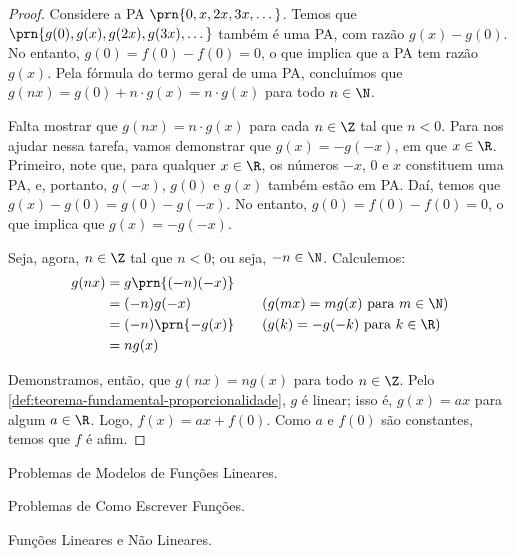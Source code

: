 \begin{proof}
    Considere a PA $\prn{0, x, 2x, 3x, \dots}$. Temos que $\prn{g(0), g(x), g(2x), g(3x), \dots}$
    também é uma PA, com razão $g(x)-g(0)$. No entanto, $g(0) = f(0)-f(0) = 0$, o que implica que a PA tem
    razão $g(x)$. Pela fórmula do termo geral de uma PA, concluímos que $g(nx) = g(0) + n\cdot g(x) = n\cdot g(x)$
    para todo $n \in \N$.

    Falta mostrar que $g(nx) = n \cdot g(x)$ para cada $n \in \Z$ tal que $n < 0$.
    Para nos ajudar nessa tarefa, vamos demonstrar que $g(x) = -g(-x)$, em que $x \in \R$. 
    Primeiro, note que, para qualquer $x \in \R$, os números $-x$, $0$ e $x$
    constituem uma PA, e, portanto, $g(-x)$, $g(0)$ e $g(x)$ também estão em PA. Daí, temos que $g(x) - g(0) = 
    g(0)-g(-x)$. No entanto, $g(0) = f(0) - f(0) = 0$, o que implica que $g(x) = -g(-x)$.

    Seja, agora, $n \in \Z$ tal que $n < 0$; ou seja, $-n \in \N$. Calculemos:
    \begin{alignat*}{3}
        g(nx) &= g\prn{(-n)(-x)} &&  \\
        &= (-n)g(-x) && \quad\text{($g(mx) = mg(x)$ para $m\in\N$)} \\
        &= (-n)\prn{-g(x)} && \quad\text{($g(k) = -g(-k)$ para $k \in \R$)} \\
        &= ng(x)
    \end{alignat*}

    Demonstramos, então, que $g(nx) = ng(x)$ para todo $n \in \Z$. Pelo \ref{def:teorema-fundamental-proporcionalidade},
    $g$ é linear; isso é, $g(x) = ax$ para algum $a \in \R$. Logo, $f(x) = ax + f(0)$. Como $a$ e $f(0)$ são constantes,
    temos que $f$ é afim.

    
 \end{proof}

\begin{onlineact}
    {Problemas de Modelos de Funções Lineares}.
\end{onlineact}

\begin{onlineact}
    {Problemas de Como Escrever Funções}.
\end{onlineact}

\begin{onlineact}
    {Funções Lineares e Não Lineares}.
\end{onlineact}